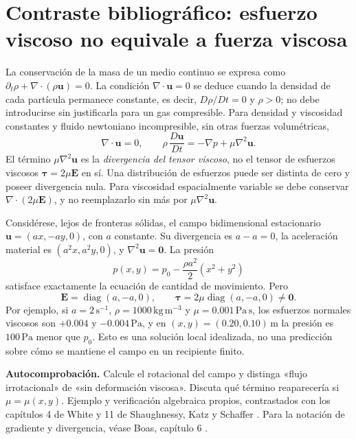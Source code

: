 
\section{Contraste bibliográfico: esfuerzo viscoso no equivale a fuerza viscosa}
\label{sec:ref26-ns}

La conservación de la masa de un medio continuo se expresa como \(\partial_t\rho+\nabla\cdot(\rho\mathbf{u})=0\). La condición \(\nabla\cdot\mathbf{u}=0\) se deduce cuando la densidad de cada partícula permanece constante, es decir, \(D\rho/Dt=0\) y \(\rho>0\); no debe introducirse sin justificarla para un gas compresible. Para densidad y viscosidad constantes y fluido newtoniano incompresible, sin otras fuerzas volumétricas,
\begin{equation}
 \nabla\cdot\mathbf{u}=0,\qquad
 \rho\,\frac{D\mathbf{u}}{Dt}=-\nabla p+\mu\nabla^2\mathbf{u}.
 \label{eq:ref26-ns-form}
\end{equation}
El término \(\mu\nabla^2\mathbf{u}\) es la \emph{divergencia del tensor viscoso}, no el tensor de esfuerzos viscosos \(\boldsymbol{\tau}=2\mu\mathbf{E}\) en sí. Una distribución de esfuerzos puede ser distinta de cero y poseer divergencia nula. Para viscosidad espacialmente variable se debe conservar \(\nabla\cdot(2\mu\mathbf{E})\), y no reemplazarlo sin más por \(\mu\nabla^2\mathbf{u}\).

\begin{tcolorbox}[title={Ejemplo guiado original: deformación plana}, studiumdef, breakable]
Considérese, lejos de fronteras sólidas, el campo bidimensional estacionario \(\mathbf{u}=(ax,-ay,0)\), con \(a\) constante. Su divergencia es \(a-a=0\), la aceleración material es \((a^2x,a^2y,0)\), y \(\nabla^2\mathbf{u}=\mathbf{0}\). La presión
\[
 p(x,y)=p_0-\frac{\rho a^2}{2}(x^2+y^2)
\]
satisface exactamente la ecuación de cantidad de movimiento. Pero
\[
 \mathbf{E}=\operatorname{diag}(a,-a,0),
 \qquad\boldsymbol{\tau}=2\mu\operatorname{diag}(a,-a,0)\ne\mathbf{0}.
\]
Por ejemplo, si \(a=2\,\mathrm{s^{-1}}\), \(\rho=1000\,\mathrm{kg\,m^{-3}}\) y \(\mu=0.001\,\mathrm{Pa\,s}\), los esfuerzos normales viscosos son \(+0.004\) y \(-0.004\,\mathrm{Pa}\), y en \((x,y)=(0.20,0.10)\,\mathrm{m}\) la presión es \(100\,\mathrm{Pa}\) menor que \(p_0\). Esto es una solución local idealizada, no una predicción sobre cómo se mantiene el campo en un recipiente finito.
\end{tcolorbox}

\textbf{Autocomprobación.} Calcule el rotacional del campo y distinga «flujo irrotacional» de «sin deformación viscosa». Discuta qué término reaparecería si \(\mu=\mu(x,y)\). Ejemplo y verificación algebraica propios, contrastados con los capítulos 4 de White \cite{ref26-white} y 11 de Shaughnessy, Katz y Schaffer \cite{ref26-shaughnessy}. Para la notación de gradiente y divergencia, véase Boas, capítulo 6 \cite{ref26-boas}.

